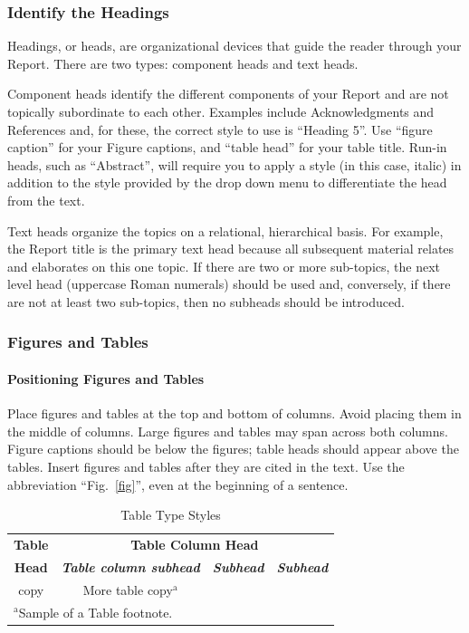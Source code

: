 \documentclass[conference]{IEEEtran}
\begin{document}
\subsubsection{Identify the Headings}
Headings, or heads, are organizational devices that guide the reader through 
your Report. There are two types: component heads and text heads.

Component heads identify the different components of your Report and are not 
topically subordinate to each other. Examples include Acknowledgments and 
References and, for these, the correct style to use is ``Heading 5''. Use 
``figure caption'' for your Figure captions, and ``table head'' for your 
table title. Run-in heads, such as ``Abstract'', will require you to apply a 
style (in this case, italic) in addition to the style provided by the drop 
down menu to differentiate the head from the text.

Text heads organize the topics on a relational, hierarchical basis. For 
example, the Report title is the primary text head because all subsequent 
material relates and elaborates on this one topic. If there are two or more 
sub-topics, the next level head (uppercase Roman numerals) should be used 
and, conversely, if there are not at least two sub-topics, then no subheads 
should be introduced.

\subsubsection{Figures and Tables}
\paragraph{Positioning Figures and Tables} Place figures and tables at the top and 
bottom of columns. Avoid placing them in the middle of columns. Large 
figures and tables may span across both columns. Figure captions should be 
below the figures; table heads should appear above the tables. Insert 
figures and tables after they are cited in the text. Use the abbreviation 
``Fig.~\ref{fig}'', even at the beginning of a sentence.

\begin{table}[htbp]
\caption{Table Type Styles}
\begin{center}
\begin{tabular}{|c|c|c|c|}
\hline
\textbf{Table}&\multicolumn{3}{|c|}{\textbf{Table Column Head}} \\
\cline{2-4} 
\textbf{Head} & \textbf{\textit{Table column subhead}}& \textbf{\textit{Subhead}}& \textbf{\textit{Subhead}} \\
\hline
copy& More table copy$^{\mathrm{a}}$& &  \\
\hline
\multicolumn{4}{l}{$^{\mathrm{a}}$Sample of a Table footnote.}
\end{tabular}
\label{tab1}
\end{center}
\end{table}
\end{document}
